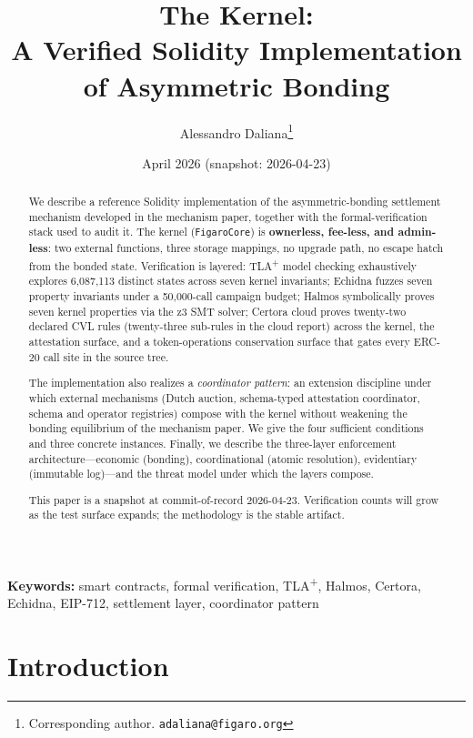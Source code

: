 \documentclass[11pt,a4paper]{article}
\title{%
  The \figaro{} Kernel:\\
  A Verified Solidity Implementation of Asymmetric Bonding%
}
\author{
  Alessandro Daliana\thanks{Corresponding author. \texttt{adaliana@figaro.org}}
}
\date{April 2026 (snapshot: 2026-04-23)}
\theoremstyle{definition}
\theoremstyle{remark}
\begin{document}
\maketitle

\begin{abstract}
We describe a reference Solidity implementation of the
asymmetric-bonding settlement mechanism developed
in the mechanism paper, together with the formal-verification
stack used to audit it. The kernel (\texttt{FigaroCore}) is
\textbf{ownerless, fee-less, and admin-less}: two external functions,
three storage mappings, no upgrade path, no escape hatch from the
bonded state. Verification is layered: TLA\textsuperscript{+} model
checking exhaustively explores 6{,}087{,}113 distinct states across
seven kernel invariants; Echidna fuzzes seven property invariants
under a 50{,}000-call campaign budget; Halmos symbolically proves
seven kernel properties via the z3 SMT solver; Certora cloud proves
twenty-two declared CVL rules (twenty-three sub-rules in the cloud
report) across the kernel, the attestation surface, and a
token-operations conservation surface that gates every ERC-20 call
site in the source tree.

The implementation also realizes a \emph{coordinator pattern}: an
extension discipline under which external mechanisms (Dutch auction,
schema-typed attestation coordinator, schema and operator registries)
compose with the kernel without weakening the bonding equilibrium
of the mechanism paper. We give the four sufficient
conditions and three concrete instances. Finally, we describe the
three-layer enforcement architecture---economic (bonding),
coordinational (atomic resolution), evidentiary (immutable
log)---and the threat model under which the layers compose.

This paper is a snapshot at commit-of-record 2026-04-23. Verification
counts will grow as the test surface expands; the methodology is the
stable artifact.
\end{abstract}

\medskip
\noindent\textbf{Keywords:}
smart contracts, formal verification, TLA\textsuperscript{+}, Halmos,
Certora, Echidna, EIP-712, settlement layer, coordinator pattern

\section{Introduction}
\label{sec:intro}
\end{document}
